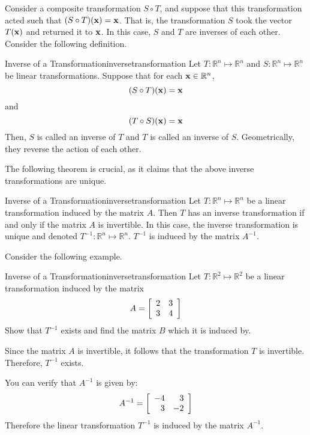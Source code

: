 Consider a composite transformation $S \circ T$, and suppose that this transformation acted such that $(S \circ T) ({\bf x}) = {\bf x}$. That is, the transformation $S$ took the vector $T({\bf x})$ and returned it to ${\bf x}$. In this case, $S$ and $T$ are inverses of each other. Consider the following definition.  

\begin{definition}{Inverse of a Transformation}{inversetransformation}
Let $T: \mathbb{R}^n \mapsto \mathbb{R}^n$ and $S:\mathbb{R}^n \mapsto \mathbb{R}^n$ be linear transformations. Suppose that for each ${\bf x} \in \mathbb{R}^n$, 
\[
(S \circ T)({\bf x}) = {\bf x}
\]
and 
\[
(T \circ S)({\bf x}) = {\bf x}
\]
Then, $S$ is called an inverse of $T$  and $T$ is called an inverse of $S$. Geometrically, they reverse the action of each other. 
\end{definition}

The following theorem is crucial, as it claims that the above inverse transformations are unique. 

\begin{theorem}{Inverse of a Transformation}{inversetransformation}
Let $T:\mathbb{R}^n \mapsto \mathbb{R}^n$ be a linear transformation induced by the matrix $A$. Then $T$ has an inverse transformation if and only if the matrix $A$ is invertible. In this case, the inverse transformation is unique and denoted $T^{-1}: \mathbb{R}^n \mapsto \mathbb{R}^n$. $T^{-1}$ is induced by the matrix $A^{-1}$. 
\end{theorem}

Consider the following example. 

\begin{example}{Inverse of a Transformation}{inversetransformation}
Let $T: \mathbb{R}^2 \mapsto \mathbb{R}^2$ be a linear transformation induced by the matrix 
\[
A = 
\left[
\begin{array}{rr}
2 & 3 \\
3 & 4
\end{array}
\right]
\]
Show that $T^{-1}$ exists and find the matrix $B$ which it is induced by. 
\end{example}

\begin{solution}
Since the matrix $A$ is invertible, it follows that the transformation $T$ is invertible. Therefore, $T^{-1}$ exists. 

You can verify that $A^{-1}$ is given by:
\[
A^{-1}
=
\left[
\begin{array}{rr}
-4 & 3 \\
3 & -2
\end{array}
\right]
\]
Therefore the linear transformation $T^{-1}$ is induced by the matrix $A^{-1}$. 
\end{solution}
